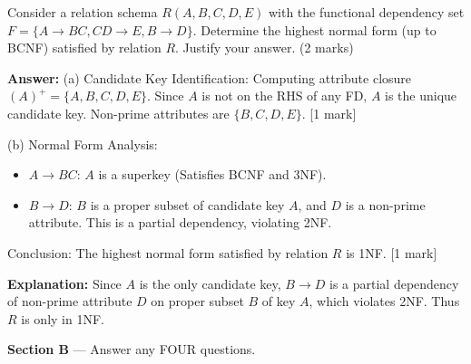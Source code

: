 \begin{tcolorbox}[enhanced,breakable,colback=boxgray,colframe=gray!45,boxrule=0.4pt,arc=2pt,left=6pt,right=6pt,top=4pt,bottom=4pt,title={Q.3},fonttitle=\bfseries\small,coltitle=black,colbacktitle=gray!15]
\small Consider a relation schema $R(A, B, C, D, E)$ with the functional dependency set $F = \{A \rightarrow BC, CD \rightarrow E, B \rightarrow D\}$. Determine the highest normal form (up to BCNF) satisfied by relation $R$. Justify your answer. (2 marks)\par\par{}\par\smallskip\textbf{Answer:} (a) Candidate Key Identification: Computing attribute closure $(A)^+ = \{A, B, C, D, E\}$. Since $A$ is not on the RHS of any FD, $A$ is the unique candidate key. Non-prime attributes are $\{B, C, D, E\}$. [1 mark]\par
(b) Normal Form Analysis: \par
\begin{itemize}[leftmargin=1.4em,itemsep=1pt]
\item $A \rightarrow BC$: $A$ is a superkey (Satisfies BCNF and 3NF).
\item $B \rightarrow D$: $B$ is a proper subset of candidate key $A$, and $D$ is a non-prime attribute. This is a partial dependency, violating 2NF.
\end{itemize}
Conclusion: The highest normal form satisfied by relation $R$ is 1NF. [1 mark]\par\par\textbf{Explanation:} Since $A$ is the only candidate key, $B \rightarrow D$ is a partial dependency of non-prime attribute $D$ on proper subset $B$ of key $A$, which violates 2NF. Thus $R$ is only in 1NF.\par
\end{tcolorbox}


\noindent\textbf{Section B} --- Answer any FOUR questions.\par\smallskip

